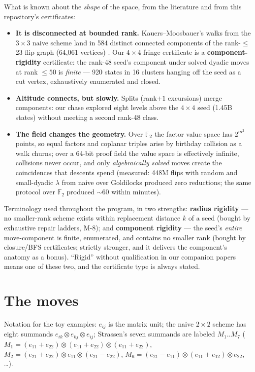 \documentclass[10pt]{article}
\begin{document}
What is known about the \emph{shape} of the space, from the
literature and from this repository's certificates:
\begin{itemize}
\item \textbf{It is disconnected at bounded rank.}
  Kauers--Moosbauer's walks from the $3{\times}3$ naive scheme land
  in 584 distinct connected components of the rank-$\le$23 flip
  graph (64{,}061 vertices) \cite{km}. Our $4{\times}4$ fringe
  certificate is a \textbf{component-rigidity} certificate: the
  rank-48 seed's component under solved dyadic moves at rank
  $\le 50$ is \emph{finite} --- 920 states in 16 clusters hanging
  off the seed as a cut vertex, exhaustively enumerated and
  closed.
\item \textbf{Altitude connects, but slowly.} Splits (rank$+1$
  excursions) merge components: our chase explored eight levels
  above the $4{\times}4$ seed (1.45B states) without meeting a
  second rank-48 class.
\item \textbf{The field changes the geometry.} Over $\mathbb{F}_2$
  the factor value space has $2^{m^2}$ points, so equal factors and
  coplanar triples arise by birthday collision as a walk churns;
  over a 64-bit proof field the value space is effectively
  infinite, collisions never occur, and only \emph{algebraically
  solved} moves create the coincidences that descents spend
  (measured: 448M flips with random and small-dyadic $\lambda$ from
  naive over Goldilocks produced zero reductions; the same protocol
  over $\mathbb{F}_2$ produced ${\sim}60$ within minutes).
\end{itemize}

Terminology used throughout the program, in two strengths:
\textbf{radius rigidity} --- no smaller-rank scheme exists within
replacement distance $k$ of a seed (bought by exhaustive repair
ladders, M-8); and \textbf{component rigidity} --- the seed's
\emph{entire} move-component is finite, enumerated, and contains
no smaller rank (bought by closure/BFS certificates; strictly
stronger, and it delivers the component's anatomy as a bonus).
``Rigid'' without qualification in our companion papers means one
of these two, and the certificate type is always stated.

\section{The moves}

Notation for the toy examples: $e_{ij}$ is the matrix unit; the
naive $2{\times}2$ scheme has eight summands
$e_{ik}\otimes e_{kj}\otimes e_{ij}$; Strassen's seven summands are
labeled $M_1..M_7$
($M_1 = (e_{11}{+}e_{22})\otimes(e_{11}{+}e_{22})\otimes(e_{11}{+}e_{22})$,
$M_2 = (e_{21}{+}e_{22})\otimes e_{11}\otimes(e_{21}{-}e_{22})$,
$M_6 = (e_{21}{-}e_{11})\otimes(e_{11}{+}e_{12})\otimes e_{22}$,
\dots).
\end{document}
